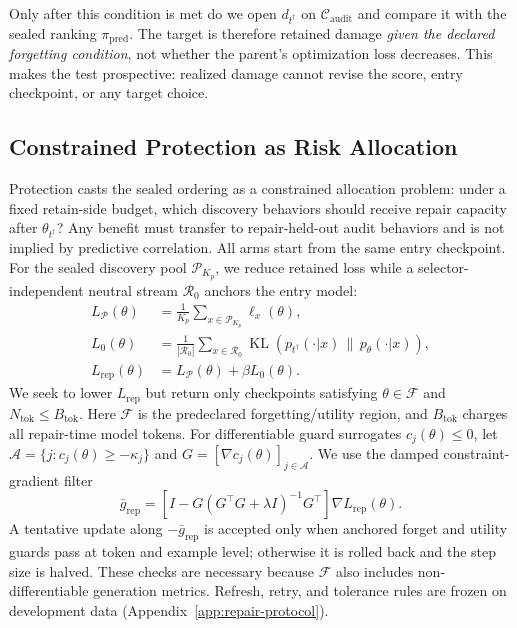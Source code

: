 Only after this condition is met do we open $d_{t^\dagger}$ on
$\mathcal C_{\mathrm{audit}}$ and compare it with the sealed ranking
$\pi_{\mathrm{pred}}$. The target is therefore retained damage
\emph{given the declared forgetting condition}, not whether the parent's
optimization loss decreases. This makes the test prospective: realized
damage cannot revise the score, entry checkpoint, or any target choice.

\subsection{Constrained Protection as Risk Allocation}
\label{sec:method-protection}

Protection casts the sealed ordering as a constrained allocation problem:
under a fixed retain-side budget, which discovery behaviors should receive
repair capacity after $\theta_{t^\dagger}$? Any benefit must transfer to
repair-held-out audit behaviors and is not implied by predictive correlation.
All arms start from the same entry checkpoint. For the sealed discovery pool
$\mathcal P_{K_p}$, we reduce retained loss while a selector-independent
neutral stream $\mathcal R_0$ anchors the entry model:
\begin{equation}
\begin{aligned}
  L_{\mathcal P}(\theta)
  &=\frac{1}{K_p}\sum_{x\in\mathcal P_{K_p}}\ell_x(\theta),\\
  L_0(\theta)
  &=\frac{1}{|\mathcal R_0|}\sum_{x\in\mathcal R_0}
    \operatorname{KL}\!\left(p_{t^\dagger}(\cdot|x)\,\|\,p_\theta(\cdot|x)\right),\\
  L_{\mathrm{rep}}(\theta)&=L_{\mathcal P}(\theta)+\beta L_0(\theta).
\end{aligned}
  \label{eq:budgeted-repair}
\end{equation}
We seek to lower $L_{\mathrm{rep}}$ but return only checkpoints satisfying
$\theta\in\mathcal F$ and $N_{\mathrm{tok}}\le B_{\mathrm{tok}}$.
Here $\mathcal F$ is the predeclared forgetting/utility region, and
$B_{\mathrm{tok}}$ charges all repair-time model tokens. For differentiable
guard surrogates $c_j(\theta)\leq0$, let
$\mathcal A=\{j:c_j(\theta)\geq-\kappa_j\}$ and
$G=[\nabla c_j(\theta)]_{j\in\mathcal A}$. We use the damped
constraint-gradient filter
\begin{equation}
  \bar g_{\mathrm{rep}}
  =
  \left[I-G(G^\top G+\lambda I)^{-1}G^\top\right]
  \nabla L_{\mathrm{rep}}(\theta).
  \label{eq:repair-projection}
\end{equation}
A tentative update along $-\bar g_{\mathrm{rep}}$ is accepted only when
anchored forget and utility guards pass at token and example level; otherwise
it is rolled back and the step size is halved. These checks are necessary
because $\mathcal F$ also includes non-differentiable generation metrics.
Refresh, retry, and tolerance rules are frozen on development data
(Appendix~\ref{app:repair-protocol}).


